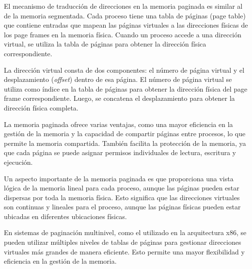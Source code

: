 \documentclass[../main.tex]{subfiles}
\begin{document}
\begin{enumerate}
\begin{itemize}
                        El mecanismo de traducción de direcciones en la memoria paginada es similar al de la memoria segmentada. Cada proceso tiene una tabla de páginas (page table) que contiene entradas que mapean las páginas virtuales a las direcciones físicas de los page frames en la memoria física. Cuando un proceso accede a una dirección virtual, se utiliza la tabla de páginas para obtener la dirección física correspondiente.
                        
                        La dirección virtual consta de dos componentes: el número de página virtual y el desplazamiento (\textit{offset}) dentro de esa página. El número de página virtual se utiliza como índice en la tabla de páginas para obtener la dirección física del page frame correspondiente. Luego, se concatena el desplazamiento para obtener la dirección física completa.
                        
                        La memoria paginada ofrece varias ventajas, como una mayor eficiencia en la gestión de la memoria y la capacidad de compartir páginas entre procesos, lo que permite la memoria compartida. También facilita la protección de la memoria, ya que cada página se puede asignar permisos individuales de lectura, escritura y ejecución.
                        
                        Un aspecto importante de la memoria paginada es que proporciona una vista lógica de la memoria lineal para cada proceso, aunque las páginas pueden estar dispersas por toda la memoria física. Esto significa que las direcciones virtuales son continuas y lineales para el proceso, aunque las páginas físicas pueden estar ubicadas en diferentes ubicaciones físicas.
                        
                        En sistemas de paginación multinivel, como el utilizado en la arquitectura x86, se pueden utilizar múltiples niveles de tablas de páginas para gestionar direcciones virtuales más grandes de manera eficiente. Esto permite una mayor flexibilidad y eficiencia en la gestión de la memoria.
                        

\end{itemize}
\end{enumerate}
\end{document}

